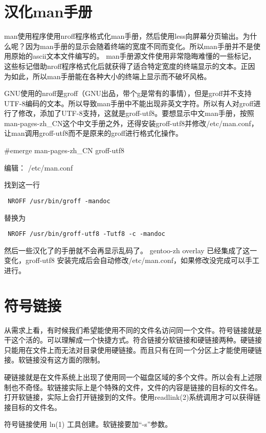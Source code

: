 \section{汉化man手册}\label{FAQ:zhman}

man使用程序使用nroff程序格式化man手册，然后使用less向屏幕分页输出。为什么呢？因为man手册的显示会随着终端的宽度不同而变化。所以man手册并不是使用原始的ascii文本文件编写的。
man手册源文件使用非常隐晦难懂的一些标记，这些标记借助nroff程序格式化后就获得了适合特定宽度的终端显示的文本。正因为如此，所以man手册能在各种大小的终端上显示而不破坏风格。

GNU使用的nroff是groff（GNU出品，带个g是常有的事情），但是groff并不支持UTF-8编码的文本。所以导致man手册中不能出现非英文字符。所以有人对groff进行了修改，添加了UTF-8支持，这就是groff-utf8。要想显示中文man手册，按照man-pages-zh\_CN这个中文手册之外，还得安装groff-utf8并修改/etc/man.conf，让man调用groff-utf8而不是原来的groff进行格式化操作。

\begin{code}
\#emerge man-pages-zh\_CN groff-utf8
\end{code}

编辑： /etc/man.conf 

找到这一行

{
\tt
NROFF           /usr/bin/groff -mandoc
}

替换为

{ \tt
NROFF           /usr/bin/groff-utf8 -Tutf8 -c -mandoc
}

然后一些汉化了的手册就不会再显示乱码了。
gentoo-zh overlay 已经集成了这一变化，groff-utf8 安装完成后会自动修改/etc/man.conf，如果修改没完成可以手工进行。

\section{符号链接}\label{faq:symlink}

从需求上看，有时候我们希望能使用不同的文件名访问同一个文件。符号链接就是干这个活的。可以理解成一个快捷方式。符合链接分软链接和硬链接两种。硬链接只能用在文件上而无法对目录使用硬链接。而且只有在同一个分区上才能使用硬链接。软链接没有这方面的限制。

硬链接就是在文件系统上出现了使用同一个磁盘区域的多个文件。所以会有上述限制也不奇怪。软链接实际上是个特殊的文件，文件的内容是链接的目标的文件名。打开软链接，实际上会打开链接到的文件。使用readlink(2)系统调用才可以获得链接目标的文件名。

符号链接使用 ln(1) 工具创建。软链接要加“-s”参数。

